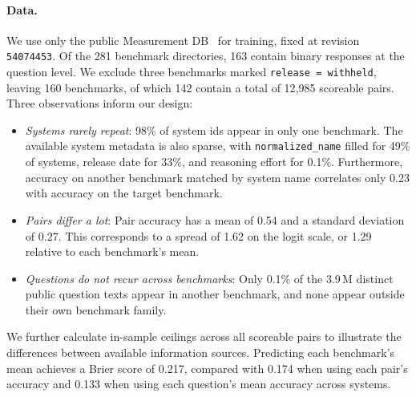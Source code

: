 \documentclass{article}
\newcommand{\code}[1]{\texttt{#1}}
\begin{document}
\paragraph{Data.} We use only the public Measurement DB~\citep{measurementdb} for training, fixed at revision \code{54074453}. Of the 281 benchmark directories, 163 contain binary responses at the question level. We exclude three benchmarks marked \code{release = withheld}, leaving 160 benchmarks, of which 142 contain a total of 12{,}985 scoreable pairs. Three observations inform our design:
\begin{itemize}
  \item \emph{Systems rarely repeat}: 98\% of system ids appear in only one benchmark. The available system metadata is also sparse, with \code{normalized\_name} filled for 49\% of systems, release date for 33\%, and reasoning effort for 0.1\%. Furthermore, accuracy on another benchmark matched by system name correlates only 0.23 with accuracy on the target benchmark.
  \item \emph{Pairs differ a lot}: Pair accuracy has a mean of 0.54 and a standard deviation of 0.27. This corresponds to a spread of 1.62 on the logit scale, or 1.29 relative to each benchmark's mean.
  \item \emph{Questions do not recur across benchmarks}: Only 0.1\% of the 3.9\,M distinct public question texts appear in another benchmark, and none appear outside their own benchmark family.
\end{itemize}
We further calculate in-sample ceilings across all scoreable pairs to illustrate the differences between available information sources. Predicting each benchmark's mean achieves a Brier score of 0.217, compared with 0.174 when using each pair's accuracy and 0.133 when using each question's mean accuracy across systems.
\end{document}

